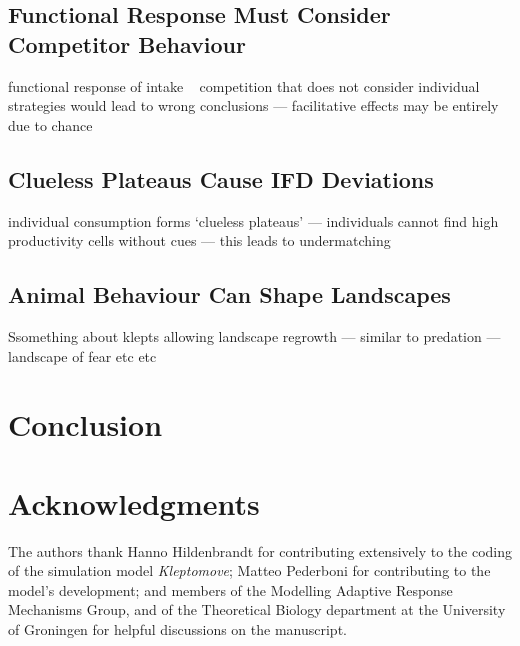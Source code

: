\documentclass[11pt]{article}
\begin{document}
\subsection{Functional Response Must Consider Competitor Behaviour}

functional response of intake ~ competition that does not consider individual strategies would lead to wrong conclusions --- facilitative effects may be entirely due to chance

\subsection{Clueless Plateaus Cause IFD Deviations}

individual consumption forms `clueless plateaus' --- individuals cannot find high productivity cells without cues --- this leads to undermatching

\subsection{Animal Behaviour Can Shape Landscapes}

Ssomething about klepts allowing landscape regrowth --- similar to predation --- landscape of fear etc etc


\section{Conclusion}



\section{Acknowledgments}

The authors thank Hanno Hildenbrandt for contributing extensively to the coding of the simulation model \textit{Kleptomove};
Matteo Pederboni for contributing to the model's development; 
and members of the Modelling Adaptive Response Mechanisms Group, and of the Theoretical Biology department at the University of Groningen for helpful discussions on the manuscript.


\end{document}
